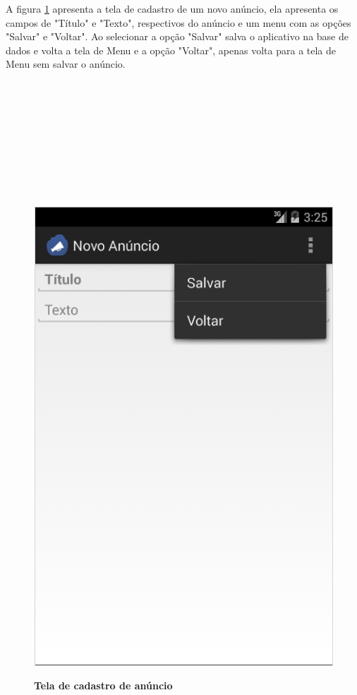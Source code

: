 \documentclass[
	12pt,				%
	openright,			%
	oneside,			%
	a4paper,			%
	chapter=TITLE,		%
	section=TITLE,		%
	english,			%
	french,				%
	spanish,			%
	brazil				%
	]{abntex2}
\begin{document}
A figura \ref{fig-android-novo-anuncio} apresenta a tela de cadastro de um novo anúncio, ela apresenta os campos de "Título" e "Texto", respectivos do anúncio e um menu com as opções "Salvar" e "Voltar". Ao selecionar a opção "Salvar" salva o aplicativo na base de dados e volta a tela de Menu e a opção "Voltar", apenas volta para a tela de Menu sem salvar o anúncio. \\ \\ \\ \\ \\ \\ \\ \\ \\ \\

\begin{figure}[h]
	\begin{center}
		\caption{
			\textbf{Tela de cadastro de anúncio}
		}\label{fig-android-novo-anuncio}
		\includegraphics [scale=0.6]{imagens/android-novo-anuncio.png}
		\label{fig-android-novo-anuncio}
	\end{center}
\end{figure}
\end{document}

